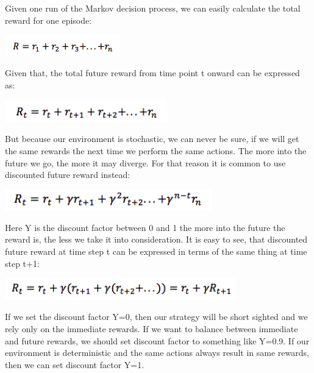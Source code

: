 \documentclass[twoside,letterpaper]{article}
\begin{document}
{{Given one run of the Markov decision process, we can easily calculate the total reward for one episode:\\
\begin{centering}
\includegraphics[width=5cm]{images/dfr.png}\\
\end{centering}
Given that, the total future reward from time point t onward can be expressed as:\\
\begin{centering}
\includegraphics[width=7cm]{images/dfr2.png}\\
\end{centering}
But because our environment is stochastic, we can never be sure, if we will get the same rewards the next time we perform the same actions. The more into the future we go, the more it may diverge. For that reason it is common to use discounted future reward instead:\\
\begin{centering}
\includegraphics[width=9cm]{images/dfr3.png}\\
\end{centering}
Here Y is the discount factor between 0 and 1 the more into the future the reward is, the less we take it into consideration. It is easy to see, that discounted future reward at time step t can be expressed in terms of the same thing at time step t+1:\\
\begin{centering}
\includegraphics[width=10cm]{images/dfr4.png}\\
\end{centering}
If we set the discount factor Y=0, then our strategy will be short sighted and we rely only on the immediate rewards. If we want to balance between immediate and future rewards, we should set discount factor to something like Y=0.9. If our environment is deterministic and the same actions always result in same rewards, then we can set discount factor Y=1.\\

}}
\end{document}
